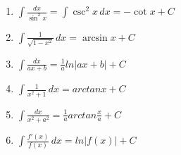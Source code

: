\begin{center}
\begin{small}
\begin{enumerate}
			\item \begin{math}
				      \int \frac{dx}{\sin^2 x}=\int \csc^2 x \, dx = -\cot x + C
			      \end{math}
			\item \begin{math}
				      \int {\frac{1}{\sqrt{1-x^2}}} \, dx = \arcsin {x} + C
			      \end{math}
			\item \begin{math}
				      \int \frac{dx}{ax + b} = \frac{1}{a} ln |ax + b| + C
			      \end{math}
			\item \begin{math}
				      \int \frac{1}{x^2 + 1} \, dx = arctan x + C
			      \end{math}
			\item \begin{math}
				      \int \frac{dx}{x^2 + a^2} = \frac{1}{a} arctan \frac{x}{a} + C
			      \end{math}
			\item \begin{math}
				      \int \frac{f'(x)}{f(x)} \, dx = ln|f(x)| + C
			      \end{math}
		\end{enumerate}
	\end{small}
\end{center}
